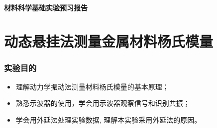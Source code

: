 \documentclass[a4paper,utf8]{article}
\begin{document}
\begin{center}
    {\mbox{}\\[7em]\bfseries\songti%
    材料科学基础实验预习报告}\\[34mm]
\end{center}
\newpage
\part{动态悬挂法测量金属材料杨氏模量}
\section{实验目的}
    \begin{itemize}
        \item 理解动力学振动法测量材料杨氏模量的基本原理；
        \item 熟悉示波器的使用，学会用示波器观察信号和识别共振； 
        \item 学会用外延法处理实验数据, 理解本实验采用外延法的原因。
    \end{itemize}
\end{document}
